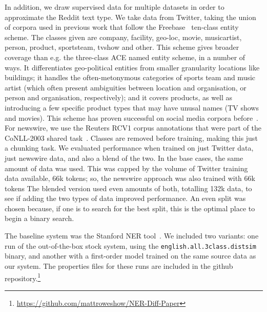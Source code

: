 \documentclass[10pt,journal,compsoc]{IEEEtran}
\begin{document}
In addition, we draw supervised data for multiple datasets in order to approximate the Reddit text type.
We take data from Twitter, taking the union of corpora used in previous work that follow the Freebase~\cite{bollacker2008freebase} ten-class entity scheme.
The classes given are company, facility, geo-loc, movie, musicartist, person, product, sportsteam, tvshow and other.
This scheme gives broader coverage than e.g. the three-class ACE named entity scheme, in a number of ways.
It differentiates geo-political entities from smaller granularity locations like buildings; it handles the often-metonymous categories of sports team and music artist (which often present ambiguities between location and organisation, or person and organisation, respectively); and it covers products, as well as introducing a few specific product types that may have unusal names (TV shows and movies).
This scheme has proven successful on social media corpora before~\cite{ritter2011named,baldwin2015shared}.
For newswire, we use the Reuters RCV1 corpus annotations that were part of the CoNLL-2003 shared task~\cite{tjong2003introduction}.
Classes are removed before training, making this just a chunking task.
We evaluated performance when trained on just Twitter data, just newswire data, and also a blend of the two.
In the base cases, the same amount of data was used.
This was capped by the volume of Twitter training data available, 66k tokens; so, the newswire approach was also trained with 66k tokens
The blended version used even amounts of both, totalling 132k data, to see if adding the two types of data improved performance.
An even split was chosen because, if one is to search for the best split, this is the optimal place to begin a binary search.

The baseline system was the Stanford NER tool~\cite{finkel2005incorporating}.
We included two variants: one run of the out-of-the-box stock system, using the {\tt \small english.all.3class.distsim} binary, and another with a first-order model trained on the same source data as our system.
The properties files for these runs are included in the github repository.\footnote{\url{https://github.com/mattroweshow/NER-Diff-Paper}}
\end{document}
